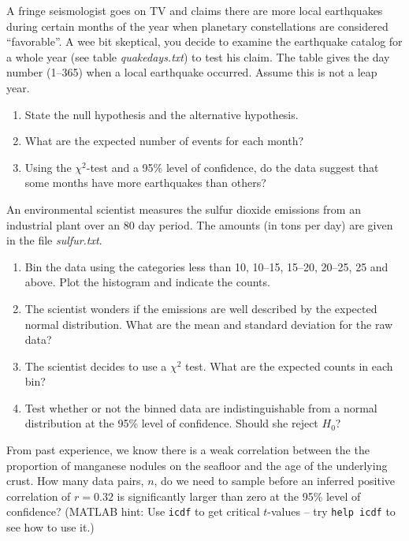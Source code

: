 \begin{problem}
\setcounter{qfringec}{\thechapter}
\setcounter{qfringep}{\theproblem}
A fringe seismologist goes on TV and claims there are
more local earthquakes during certain months of the year when planetary constellations are
considered ``favorable''.  A wee bit skeptical, you decide to examine the earthquake catalog
for a whole year (see table \emph{quakedays.txt}) to test his claim.  The table gives
the day number (1--365) when a local earthquake occurred.  Assume this is not a leap year.
\begin{enumerate}[label=\alph*)]
\item State the null hypothesis and the alternative hypothesis.
\item What are the expected number of events for each month?
\item Using the $\chi^2$-test and a 95\% level of confidence,
do the data suggest that some months have more earthquakes than others?
\end{enumerate}
\end{problem}

\begin{problem}
An environmental scientist measures the sulfur dioxide emissions from an industrial plant
over an 80 day period.  The amounts (in tons per day) are given in the file \emph{sulfur.txt}.
\begin{enumerate}[label=\alph*)]
\item Bin the data using the categories less than 10, 10--15, 15--20, 20--25, 25 and above.
   Plot the histogram and indicate the counts.
\item The scientist wonders if the emissions are well described by the expected normal distribution.
  What are the mean and standard deviation for the raw data?
\item The scientist decides to use a $\chi^2$ test.  What are the expected counts in each bin?
\item Test whether or not the binned data are indistinguishable from a normal distribution
  at the 95\% level of confidence.  Should she reject $H_0$?
\end{enumerate}
\end{problem}

\begin{problem}
From past experience, we know there is a weak correlation between the the proportion
of manganese nodules on the seafloor and the age of the underlying crust.  How many data
pairs, $n$, do we need to sample before an inferred positive correlation of $r = 0.32$ is significantly
larger than zero at the 95\% level of confidence?  (MATLAB hint:  Use \texttt {icdf} to get
critical $t$-values -- try \texttt {help icdf} to see how to use it.)
\end{problem}

